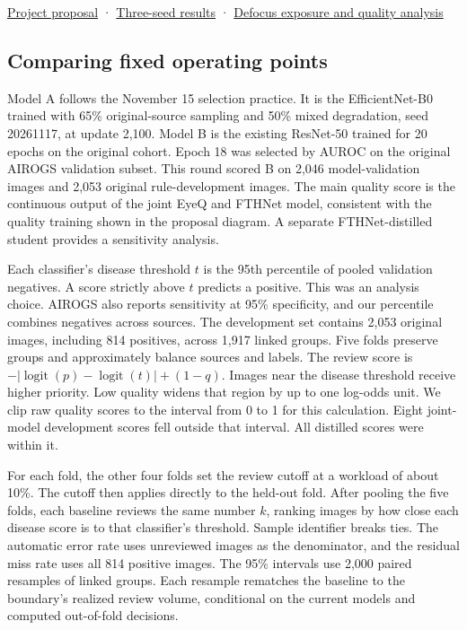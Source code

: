\documentclass[
  10pt,
  letterpaper,
]{article}
\begin{document}
\href{../../../proposal-1106.pdf}{Project proposal} ·
\href{../2026-11-15/completed-experiments/completed-results.en.md}{Three-seed
results} · \href{quality-alignment.en.md}{Defocus exposure and quality
analysis}

\subsection{Comparing fixed operating
points}\label{comparing-fixed-operating-points}

Model A follows the November 15 selection practice. It is the
EfficientNet-B0 trained with 65\% original-source sampling and 50\%
mixed degradation, seed 20261117, at update 2,100. Model B is the
existing ResNet-50 trained for 20 epochs on the original cohort. Epoch
18 was selected by AUROC on the original AIROGS validation subset. This
round scored B on 2,046 model-validation images and 2,053 original
rule-development images. The main quality score is the continuous output
of the joint EyeQ and FTHNet model, consistent with the quality training
shown in the proposal diagram. A separate FTHNet-distilled student
provides a sensitivity analysis.

Each classifier's disease threshold \(t\) is the 95th percentile of
pooled validation negatives. A score strictly above \(t\) predicts a
positive. This was an analysis choice. AIROGS also reports sensitivity
at 95\% specificity, and our percentile combines negatives across
sources. The development set contains 2,053 original images, including
814 positives, across 1,917 linked groups. Five folds preserve groups
and approximately balance sources and labels. The review score is
\(-|\operatorname{logit}(p)-\operatorname{logit}(t)|+(1-q)\). Images
near the disease threshold receive higher priority. Low quality widens
that region by up to one log-odds unit. We clip raw quality scores to
the interval from 0 to 1 for this calculation. Eight joint-model
development scores fell outside that interval. All distilled scores were
within it.

For each fold, the other four folds set the review cutoff at a workload
of about 10\%. The cutoff then applies directly to the held-out fold.
After pooling the five folds, each baseline reviews the same number
\(k\), ranking images by how close each disease score is to that
classifier's threshold. Sample identifier breaks ties. The automatic
error rate uses unreviewed images as the denominator, and the residual
miss rate uses all 814 positive images. The 95\% intervals use 2,000
paired resamples of linked groups. Each resample rematches the baseline
to the boundary's realized review volume, conditional on the current
models and computed out-of-fold decisions.
\end{document}
